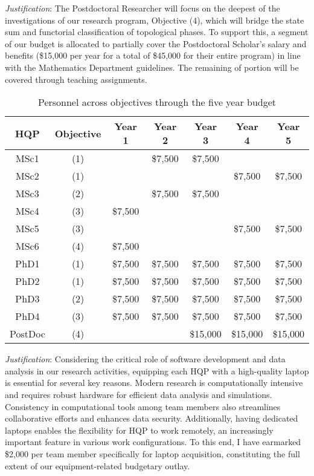 \documentclass[12pt]{article}
\begin{document}
	\medskip

	\noindent\textit{Justification}:
	The Postdoctoral Researcher will focus on the deepest of the investigations of our research program, Objective (4), which will bridge the state sum and functorial classification of topological phases.
	To support this, a segment of our budget is allocated to partially cover the Postdoctoral Scholar's salary and benefits (\$15,000 per year for a total of \$45,000 for their entire program) in line with the Mathematics Department guidelines.
	The remaining of portion will be covered through teaching assignments.

	\begin{table}
		\centering
		\begin{tabular}{|c|c|c|c|c|c|c|}
			\hline
			HQP & Objective & Year 1 & Year 2 & Year 3 & Year 4 & Year 5 \\
			\hline
			MSc1& (1) &  & \$7,500 & \$7,500 &  &  \\
			\hline
			MSc2& (1) &  &  &  & \$7,500 & \$7,500 \\
			\hline
			MSc3& (2) &  & \$7,500 & \$7,500 &  &  \\
			\hline
			MSc4& (3) & \$7,500 &  &  &  &  \\
			\hline
			MSc5& (3) &  &  &  & \$7,500 & \$7,500 \\
			\hline
			MSc6& (4) & \$7,500 &  &  &  &  \\
			\hline
			PhD1& (1) & \$7,500 & \$7,500 & \$7,500 & \$7,500 & \$7,500 \\
			\hline
			PhD2& (1) & \$7,500 & \$7,500 & \$7,500 & \$7,500 & \$7,500 \\
			\hline
			PhD3& (2) & \$7,500 & \$7,500 & \$7,500 & \$7,500 & \$7,500 \\
			\hline
			PhD4& (3) & \$7,500 & \$7,500 & \$7,500 & \$7,500 & \$7,500 \\
			\hline
			PostDoc& (4) &  &  & \$15,000 & \$15,000 & \$15,000 \\
			\hline
		\end{tabular}
		\caption{Personnel across objectives through the five year budget}
	\end{table}

	\medskip

	\noindent\textit{Justification}: Considering the critical role of software development and data analysis in our research activities, equipping each HQP with a high-quality laptop is essential for several key reasons. Modern research is computationally intensive and requires robust hardware for efficient data analysis and simulations. Consistency in computational tools among team members also streamlines collaborative efforts and enhances data security. Additionally, having dedicated laptops enables the flexibility for HQP to work remotely, an increasingly important feature in various work configurations. To this end, I have earmarked \$2,000 per team member specifically for laptop acquisition, constituting the full extent of our equipment-related budgetary outlay.
\end{document}
